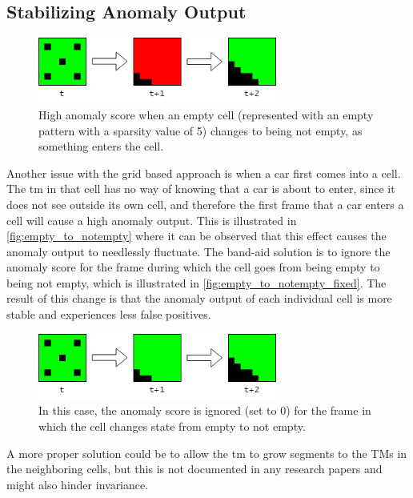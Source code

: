 \subsection{Stabilizing Anomaly Output}
\label{sec:stabilizing_anomaly_output}
\begin{figure}[H]
    \centering
    \includegraphics[width=0.7\textwidth]{resources/methodology/empty_to_notempty.png}
    \caption[Stabilizing Anomaly Output Visualization 1]{High anomaly score when an empty cell (represented with an empty pattern with a sparsity value of 5) changes to being not empty, as something enters the cell.}
    \label{fig:empty_to_notempty}
\end{figure}
Another issue with the grid based approach is when a car first comes into a cell. The \gls*{tm} in that cell has no way of knowing that a car is about to enter, since it does not see outside its own cell, and therefore the first frame that a car enters a cell will cause a high anomaly output. This is illustrated in \autoref{fig:empty_to_notempty} where it can be observed that this effect causes the anomaly output to needlessly fluctuate. The band-aid solution is to ignore the anomaly score for the frame during which the cell goes from being empty to being not empty, which is illustrated in \autoref{fig:empty_to_notempty_fixed}. The result of this change is that the anomaly output of each individual cell is more stable and experiences less false positives.
\begin{figure}[H]
    \centering
    \includegraphics[width=0.7\textwidth]{resources/methodology/empty_to_notempty_fixed.png}
    \caption[Stabilizing Anomaly Output Visualization 2]{In this case, the anomaly score is ignored (set to 0) for the frame in which the cell changes state from empty to not empty.}
    \label{fig:empty_to_notempty_fixed}
\end{figure}

\par
A more proper solution could be to allow the \gls*{tm} to grow segments to the TMs in the neighboring cells, but this is not documented in any research papers and might also hinder invariance.
